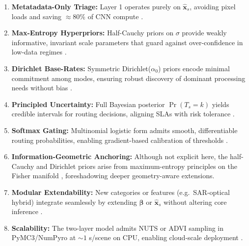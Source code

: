 \documentclass{article}
\begin{document}
\begin{enumerate}
  \item \textbf{Metatadata-Only Triage:}  
    Layer 1 operates purely on \(\hat{\mathbf x}_s\), avoiding pixel loads and saving \(\approx\!80\%\) of CNN compute \citep{Cumulo2019}.  

  \item \textbf{Max-Entropy Hyperpriors:}  
    Half-Cauchy priors on \(\sigma\) provide weakly informative, invariant scale parameters that guard against over-confidence in low-data regimes \citep{Gelman2006,PolsonScott2012}.  

  \item \textbf{Dirichlet Base-Rates:}  
    Symmetric Dirichlet(\(\alpha_0\)) priors encode minimal commitment among modes, ensuring robust discovery of dominant processing needs without bias \citep{Teh2006_JASA}.  

  \item \textbf{Principled Uncertainty:}  
    Full Bayesian posterior \(\Pr(T_s=k)\) yields credible intervals for routing decisions, aligning SLAs with risk tolerance \citep{Gelman2008}.  

  \item \textbf{Softmax Gating:}  
    Multinomial logistic form admits smooth, differentiable routing probabilities, enabling gradient-based calibration of thresholds \citep{Jordan1994,McCullaghNelder1998}.  

  \item \textbf{Information-Geometric Anchoring:}  
    Although not explicit here, the half-Cauchy and Dirichlet priors arise from maximum-entropy principles on the Fisher manifold \citep{AmariNagaoka2007,FisherInfoWiki}, foreshadowing deeper geometry-aware extensions.  

  \item \textbf{Modular Extendability:}  
    New categories or features (e.g.\ SAR-optical hybrid) integrate seamlessly by extending \(\bm\beta\) or \(\hat{\mathbf x}_s\) without altering core inference \citep{Jordan1994,Teh2006}.  

  \item \textbf{Scalability:}  
    The two-layer model admits NUTS or ADVI sampling in PyMC3/NumPyro at \(\sim\!1\) s/scene on CPU, enabling cloud‐scale deployment \citep{Salvatier2016}.  
\end{enumerate}



\end{document}

